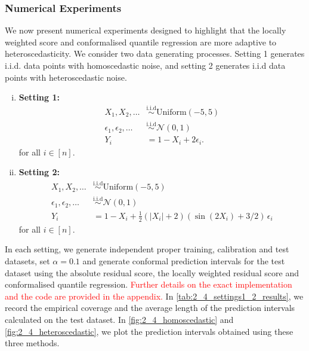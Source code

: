\documentclass[11pt, titlepage]{article} %
\newcommand{\R}{\mathrm}
\numberwithin{equation}{section}
\theoremstyle{definition}
\numberwithin{theorem}{section}
\numberwithin{lemma}{section}
\numberwithin{corollary}{section}
\numberwithin{proposition}{section}
\numberwithin{definition}{section}
\numberwithin{remark}{section}
\begin{document}
\subsubsection{Numerical Experiments}

We now present numerical experiments designed to highlight that the locally weighted score and conformalised quantile regression are more adaptive to heteroscedasticity. We consider two data generating processes. Setting 1 generates i.i.d. data points with homoscedastic noise, and setting 2 generates i.i.d data points with heteroscedastic noise.
\begin{enumerate}[(i)]
    \item \textbf{Setting 1: } \begin{align*}
        X_1, X_2, \ldots &\overset{\R{i.i.d}}{\sim} \R{Uniform}(-5,5) \\
        \epsilon_1, \epsilon_2, \ldots &\overset{\R{i.i.d}}{\sim} \mathcal{N}(0,1) \\
        Y_i &= 1 - X_i + 2\epsilon_i. 
    \end{align*} for all \(i \in [n]\).
    \item \textbf{Setting 2: } \begin{align*}
        X_1, X_2, \ldots &\overset{\R{i.i.d}}{\sim} \R{Uniform}(-5,5) \\
        \epsilon_1, \epsilon_2, \ldots &\overset{\R{i.i.d}}{\sim} \mathcal{N}(0,1) \\
        Y_i &= 1 - X_i + \frac{1}{2}(|X_i| + 2)(\sin(2X_i) + 3/2) \, \epsilon_i
    \end{align*} for all \(i \in [n]\).    
\end{enumerate}

\noindent
In each setting, we generate independent proper training, calibration and test datasets, set \(\alpha = 0.1\) and generate conformal prediction intervals for the test dataset using the absolute residual score, the locally weighted residual score and conformalised quantile regression. \textcolor{red}{Further details on the exact implementation and the code are provided in the appendix.} In \cref{tab:2_4_settings1_2_results}, we record the empirical coverage and the average length of the prediction intervals calculated on the test dataset. In \cref{fig:2_4_homoscedastic} and \cref{fig:2_4_heteroscedastic}, we plot the prediction intervals obtained using these three methods. \vskip5pt
\end{document}
